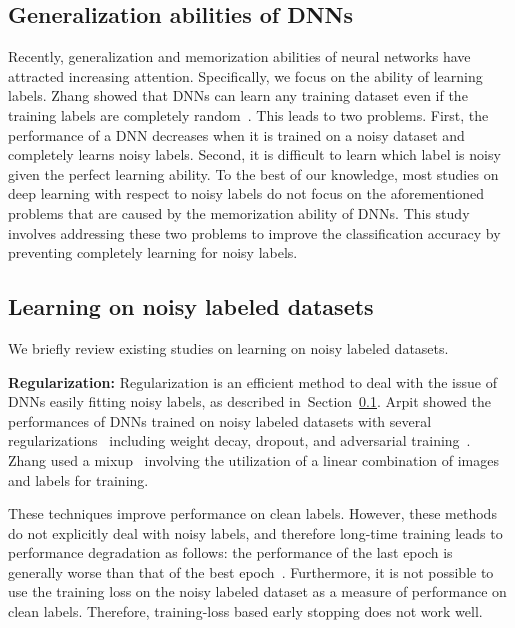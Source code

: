 \documentclass[10pt,twocolumn,letterpaper]{article}
\newcommand{\Sref}[1]{Section~\ref{#1}}
\begin{document}
\subsection{Generalization abilities of DNNs}
\label{sec:generalization}
Recently, generalization and memorization abilities of neural networks have attracted increasing attention. Specifically, we focus on the ability of learning labels. Zhang \etal showed that DNNs can learn any training dataset even if the training labels are completely random~\cite{zhang2016understanding}. This leads to two problems.  First, the performance of a DNN decreases when it is trained on a noisy dataset and completely learns noisy labels. Second, it is difficult to learn which label is noisy given the perfect learning ability. To the best of our knowledge, most studies on deep learning with respect to noisy labels do not focus on the aforementioned problems that are caused by the memorization ability of DNNs. This study involves addressing these two problems to improve the classification accuracy by preventing completely learning for noisy labels.

\subsection{Learning on noisy labeled datasets}
We briefly review existing studies on learning on noisy labeled datasets.

\vspace{2mm}\noindent\textbf{Regularization:}
Regularization is an efficient method to deal with the issue of DNNs easily fitting noisy labels, as described in~\Sref{sec:generalization}. Arpit \etal showed the performances of DNNs trained on noisy labeled datasets with several regularizations~\cite{arpit2017closer} including weight decay, dropout, and adversarial training~\cite{goodfellow2014explaining}.
Zhang \etal used a mixup~\cite{zhang2017mixup} involving the utilization of a linear combination of images and labels for training.

These techniques improve performance on clean labels. However, these methods do not explicitly deal with noisy labels, and therefore long-time training leads to performance degradation as follows: the performance of the last epoch is generally worse than that of the best epoch~\cite{zhang2017mixup}. Furthermore, it is not possible to use the training loss on the noisy labeled dataset as a measure of performance on clean labels. Therefore, training-loss based early stopping does not work well.
\end{document}
